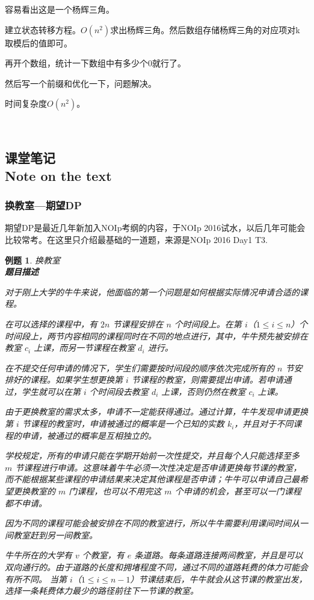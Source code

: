 \documentclass{article}
\newtheorem{example}{例题}[subsection]
\theoremstyle{nonumberplain}
\newcommand{\note}{\ \par
	\subsection*{课堂笔记\\\tiny{Note on the text}}
	\newpage}
\begin{document}
	容易看出这是一个杨辉三角。

	建立状态转移方程。$O(n^2)$求出杨辉三角。然后数组存储杨辉三角的对应项对k取模后的值即可。

	再开个数组，统计一下数组中有多少个0就行了。

	然后写一个前缀和优化一下，问题解决。

	时间复杂度$O(n^2)$。

	\note

	\subsubsection{换教室---期望DP}
	期望DP是最近几年新加入NOIp考纲的内容，于NOIp 2016试水，以后几年可能会比较常考。在这里只介绍最基础的一道题，来源是NOIp 2016 Day1 T3.

	\begin{example} 换教室\\
		\textbf{题目描述}

		对于刚上大学的牛牛来说，他面临的第一个问题是如何根据实际情况申请合适的课程。

		在可以选择的课程中，有 $2n$ 节课程安排在 $n$ 个时间段上。在第 $i$（$1 \leq i \leq n$）个时间段上，两节内容相同的课程同时在不同的地点进行，其中，牛牛预先被安排在教室 $c_i$ 上课，而另一节课程在教室 $d_i$ 进行。

		在不提交任何申请的情况下，学生们需要按时间段的顺序依次完成所有的 $n$ 节安排好的课程。如果学生想更换第 $i$ 节课程的教室，则需要提出申请。若申请通过，学生就可以在第 $i$ 个时间段去教室 $d_i$ 上课，否则仍然在教室 $c_i$ 上课。

		由于更换教室的需求太多，申请不一定能获得通过。通过计算，牛牛发现申请更换第 $i$ 节课程的教室时，申请被通过的概率是一个已知的实数 $k_i$，并且对于不同课程的申请，被通过的概率是互相独立的。

		学校规定，所有的申请只能在学期开始前一次性提交，并且每个人只能选择至多 $m$ 节课程进行申请。这意味着牛牛必须一次性决定是否申请更换每节课的教室，而不能根据某些课程的申请结果来决定其他课程是否申请；牛牛可以申请自己最希望更换教室的 $m$ 门课程，也可以不用完这 $m$ 个申请的机会，甚至可以一门课程都不申请。

		因为不同的课程可能会被安排在不同的教室进行，所以牛牛需要利用课间时间从一间教室赶到另一间教室。

		牛牛所在的大学有 $v$ 个教室，有 $e$ 条道路。每条道路连接两间教室，并且是可以双向通行的。由于道路的长度和拥堵程度不同，通过不同的道路耗费的体力可能会有所不同。 当第 $i$（$1 \leq i \leq n-1$）节课结束后，牛牛就会从这节课的教室出发，选择一条耗费体力最少的路径前往下一节课的教室。


\end{example}
\end{document}
